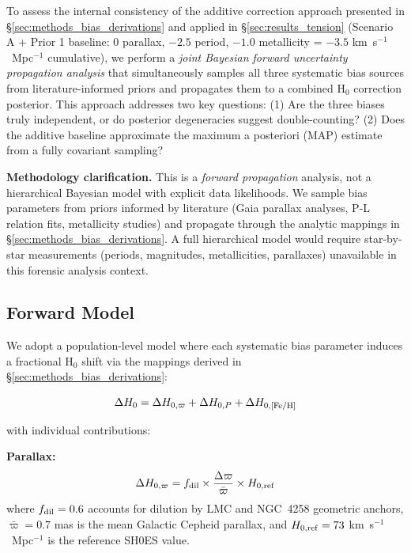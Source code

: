 \documentclass[preprint, linenumbers]{aastex701}
\begin{document}
To assess the internal consistency of the additive correction approach presented in \S\ref{sec:methods_bias_derivations} and applied in \S\ref{sec:results_tension} (Scenario A + Prior 1 baseline: 0 parallax, $-2.5$ period, $-1.0$ metallicity = $-3.5$ km~s$^{-1}$~Mpc$^{-1}$ cumulative), we perform a \textit{joint Bayesian forward uncertainty propagation analysis} that simultaneously samples all three systematic bias sources from literature-informed priors and propagates them to a combined H$_0$ correction posterior. This approach addresses two key questions: (1) Are the three biases truly independent, or do posterior degeneracies suggest double-counting? (2) Does the additive baseline approximate the maximum a posteriori (MAP) estimate from a fully covariant sampling?

\textbf{Methodology clarification.} This is a \textit{forward propagation} analysis, not a hierarchical Bayesian model with explicit data likelihoods. We sample bias parameters from priors informed by literature (Gaia parallax analyses, P-L relation fits, metallicity studies) and propagate through the analytic mappings in \S\ref{sec:methods_bias_derivations}. A full hierarchical model would require star-by-star measurements (periods, magnitudes, metallicities, parallaxes) unavailable in this forensic analysis context.

\subsection{Forward Model}

We adopt a population-level model where each systematic bias parameter induces a fractional H$_0$ shift via the mappings derived in \S\ref{sec:methods_bias_derivations}:

\begin{equation}
\Delta H_0 = \Delta H_{0,\varpi} + \Delta H_{0,P} + \Delta H_{0,{\rm [Fe/H]}}
\end{equation}

with individual contributions:

\textbf{Parallax:}
\begin{equation}
\Delta H_{0,\varpi} = f_{\rm dil} \times \frac{\Delta\varpi}{\bar{\varpi}} \times H_{0,\rm ref}
\end{equation}
where $f_{\rm dil} = 0.6$ accounts for dilution by LMC and NGC~4258 geometric anchors, $\bar{\varpi} = 0.7$ mas is the mean Galactic Cepheid parallax, and $H_{0,\rm ref} = 73$ km~s$^{-1}$~Mpc$^{-1}$ is the reference SH0ES value.
\end{document}
